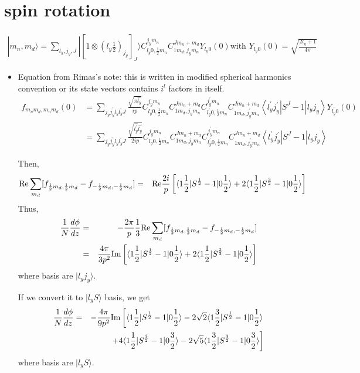 \documentclass[10pt]{article}
\newcommand{\bea}{\begin{eqnarray}}
\newcommand{\eea}{\end{eqnarray}}
\newcommand{\no}{\nonumber \\}
\def\la{\langle}
\def\ra{\rangle}
\begin{document}
\section{spin rotation}
\bea
|m_n,m_d\ra
=\sum_{l_y,j_y,J}
  |[1\otimes(l_y \frac{1}{2})_{j_y}]_J\ra
  C_{l_y 0,\frac{1}{2}m_n}^{j_y m_n}
  C_{1m_d, j_y m_n}^{J m_n+m_d}Y_{l_y 0}(0)   
  \mbox{with }Y_{l_y 0}(0)=\sqrt{\frac{2l_y+1}{4\pi}}
\eea

\begin{itemize}
\item Equation from Rimas's note:  this is written in modified
spherical harmonics convention or its state vectors
contains $i^l$ factors in itself.
\begin{align*}
f_{m_{n}m_{d},m_{n}m_{d}}(0)  & =%
{\displaystyle\sum\limits_{j_{y}j_{y}^{\prime}l_{y}l_{y}^{\prime}J}}
\frac{\sqrt{\pi\widehat{l_{y}}}}{ip}C_{l_{y}0,\frac{1}{2}m_{n}}^{j_{y}m_{n}%
}C_{1m_{d},j_{y}m_{n}}^{Jm_{n}+m_{d}}C_{l_{y}^{\prime}0,\frac{1}{2}m_{n}%
}^{j_{y}^{\prime}m_{n}}C_{1m_{d},j_{y}^{\prime}m_{n}}^{Jm_{n}+m_{d}%
}\left\langle l_{y}^{\prime}j_{y}^{\prime}\right\vert S^{J}-1\left\vert
l_{y}j_{y}\right\rangle Y_{l_{y}^{\prime}0}(0)\\
& =%
{\displaystyle\sum\limits_{j_{y}j_{y}^{\prime}l_{y}l_{y}^{\prime}J}}
\frac{\sqrt{\widehat{l_{y}^{\prime}}\widehat{l_{y}}}}{2ip}C_{l_{y}0,\frac
{1}{2}m_{n}}^{j_{y}m_{n}}C_{1m_{d},j_{y}m_{n}}^{Jm_{n}+m_{d}}C_{l_{y}^{\prime
}0,\frac{1}{2}m_{n}}^{j_{y}^{\prime}m_{n}}C_{1m_{d},j_{y}^{\prime}m_{n}%
}^{Jm_{n}+m_{d}}\left\langle l_{y}^{\prime}j_{y}^{\prime}\right\vert
S^{J}-1\left\vert l_{y}j_{y}\right\rangle
\end{align*}

Then,
\bea
{\rm Re}\sum_{m_d}[f_{\frac{1}{2}m_d,\frac{1}{2}m_d}
            -f_{-\frac{1}{2}m_d,-\frac{1}{2}m_d}]
&=&{\rm Re}\frac{2i}{p}\left[\la 1\frac{1}{2}|S^{\frac{1}{2}}-1|0\frac{1}{2}\ra+2\la 1\frac{1}{2}|S^{\frac{3}{2}}-1|0\frac{1}{2}\ra\right]
\eea
Thus,
\bea
\frac{1}{N}\frac{d\phi}{dz}
&=&-\frac{2\pi}{p}\frac{1}{3}{\rm Re}\sum_{m_d}[f_{\frac{1}{2}m_d,\frac{1}{2}m_d}
            -f_{-\frac{1}{2}m_d,-\frac{1}{2}m_d}]\no
&=&\frac{4\pi}{3p^2}{\rm Im}\left[\la 1\frac{1}{2}|S^{\frac{1}{2}}-1|0\frac{1}{2}\ra+2\la 1\frac{1}{2}|S^{\frac{3}{2}}-1|0\frac{1}{2}\ra\right]
\eea
where basis are $|l_y j_y\ra$.

If we convert it to $|l_y S\ra$ basis, we get
\bea
\frac{1}{N}\frac{d\phi}{dz}
&=&-\frac{4\pi}{9p^2}{\rm Im}\left[
\la 1\frac{1}{2}|S^{\frac{1}{2}}-1|0\frac{1}{2}\ra
-2\sqrt{2}\la 1\frac{3}{2}|S^{\frac{1}{2}}-1|0\frac{1}{2}\ra
 \right.\no & &\left.
+4\la 1\frac{1}{2}|S^{\frac{3}{2}}-1|0\frac{3}{2}\ra
-2\sqrt{5}\la 1\frac{3}{2}|S^{\frac{3}{2}}-1|0\frac{3}{2}
\ra\right]
\eea
where basis are $|l_y S\ra$.


\end{itemize}
\end{document}
